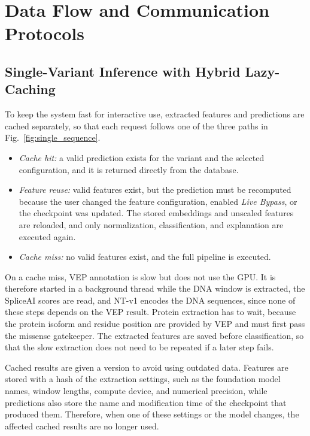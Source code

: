 \section{Data Flow and Communication Protocols}
\label{sec:data_flow}

\subsection{Single-Variant Inference with Hybrid Lazy-Caching}

To keep the system fast for interactive use, extracted features and predictions are cached separately, so that each request follows one of the three paths in Fig.~\ref{fig:single_sequence}.

\begin{itemize}
    \item \textit{Cache hit:} a valid prediction exists for the variant and the selected configuration, and it is returned directly from the database.
    \item \textit{Feature reuse:} valid features exist, but the prediction must be recomputed because the user changed the feature configuration, enabled \textit{Live Bypass}, or the checkpoint was updated. The stored embeddings and unscaled features are reloaded, and only normalization, classification, and explanation are executed again.
    \item \textit{Cache miss:} no valid features exist, and the full pipeline is executed.
\end{itemize}

On a cache miss, VEP annotation is slow but does not use the GPU. It is therefore started in a background thread while the DNA window is extracted, the SpliceAI scores are read, and NT-v1 encodes the DNA sequences, since none of these steps depends on the VEP result. Protein extraction has to wait, because the protein isoform and residue position are provided by VEP and must first pass the missense gatekeeper. The extracted features are saved before classification, so that the slow extraction does not need to be repeated if a later step fails.

Cached results are given a version to avoid using outdated data. Features are stored with a hash of the extraction settings, such as the foundation model names, window lengths, compute device, and numerical precision, while predictions also store the name and modification time of the checkpoint that produced them. Therefore, when one of these settings or the model changes, the affected cached results are no longer used.

